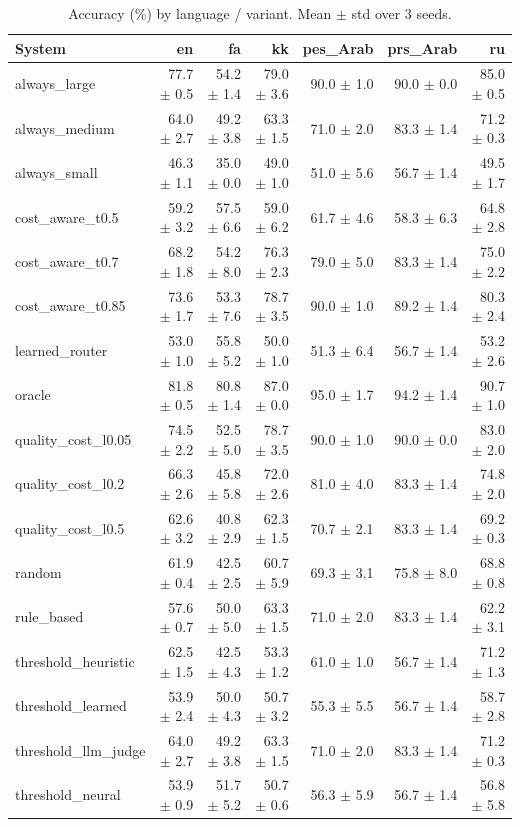 \begin{table}[t]
\centering
\small
\caption{Accuracy (\%) by language / variant. Mean $\pm$ std over 3 seeds.}
\label{tab:language_breakdown}
\begin{tabular}{lrrrrrr}
\toprule
System & en & fa & kk & pes\_Arab & prs\_Arab & ru \\
\midrule
always\_large & 77.7 $\pm$ 0.5 & 54.2 $\pm$ 1.4 & 79.0 $\pm$ 3.6 & 90.0 $\pm$ 1.0 & 90.0 $\pm$ 0.0 & 85.0 $\pm$ 0.5 \\
always\_medium & 64.0 $\pm$ 2.7 & 49.2 $\pm$ 3.8 & 63.3 $\pm$ 1.5 & 71.0 $\pm$ 2.0 & 83.3 $\pm$ 1.4 & 71.2 $\pm$ 0.3 \\
always\_small & 46.3 $\pm$ 1.1 & 35.0 $\pm$ 0.0 & 49.0 $\pm$ 1.0 & 51.0 $\pm$ 5.6 & 56.7 $\pm$ 1.4 & 49.5 $\pm$ 1.7 \\
cost\_aware\_t0.5 & 59.2 $\pm$ 3.2 & 57.5 $\pm$ 6.6 & 59.0 $\pm$ 6.2 & 61.7 $\pm$ 4.6 & 58.3 $\pm$ 6.3 & 64.8 $\pm$ 2.8 \\
cost\_aware\_t0.7 & 68.2 $\pm$ 1.8 & 54.2 $\pm$ 8.0 & 76.3 $\pm$ 2.3 & 79.0 $\pm$ 5.0 & 83.3 $\pm$ 1.4 & 75.0 $\pm$ 2.2 \\
cost\_aware\_t0.85 & 73.6 $\pm$ 1.7 & 53.3 $\pm$ 7.6 & 78.7 $\pm$ 3.5 & 90.0 $\pm$ 1.0 & 89.2 $\pm$ 1.4 & 80.3 $\pm$ 2.4 \\
learned\_router & 53.0 $\pm$ 1.0 & 55.8 $\pm$ 5.2 & 50.0 $\pm$ 1.0 & 51.3 $\pm$ 6.4 & 56.7 $\pm$ 1.4 & 53.2 $\pm$ 2.6 \\
oracle & 81.8 $\pm$ 0.5 & 80.8 $\pm$ 1.4 & 87.0 $\pm$ 0.0 & 95.0 $\pm$ 1.7 & 94.2 $\pm$ 1.4 & 90.7 $\pm$ 1.0 \\
quality\_cost\_l0.05 & 74.5 $\pm$ 2.2 & 52.5 $\pm$ 5.0 & 78.7 $\pm$ 3.5 & 90.0 $\pm$ 1.0 & 90.0 $\pm$ 0.0 & 83.0 $\pm$ 2.0 \\
quality\_cost\_l0.2 & 66.3 $\pm$ 2.6 & 45.8 $\pm$ 5.8 & 72.0 $\pm$ 2.6 & 81.0 $\pm$ 4.0 & 83.3 $\pm$ 1.4 & 74.8 $\pm$ 2.0 \\
quality\_cost\_l0.5 & 62.6 $\pm$ 3.2 & 40.8 $\pm$ 2.9 & 62.3 $\pm$ 1.5 & 70.7 $\pm$ 2.1 & 83.3 $\pm$ 1.4 & 69.2 $\pm$ 0.3 \\
random & 61.9 $\pm$ 0.4 & 42.5 $\pm$ 2.5 & 60.7 $\pm$ 5.9 & 69.3 $\pm$ 3.1 & 75.8 $\pm$ 8.0 & 68.8 $\pm$ 0.8 \\
rule\_based & 57.6 $\pm$ 0.7 & 50.0 $\pm$ 5.0 & 63.3 $\pm$ 1.5 & 71.0 $\pm$ 2.0 & 83.3 $\pm$ 1.4 & 62.2 $\pm$ 3.1 \\
threshold\_heuristic & 62.5 $\pm$ 1.5 & 42.5 $\pm$ 4.3 & 53.3 $\pm$ 1.2 & 61.0 $\pm$ 1.0 & 56.7 $\pm$ 1.4 & 71.2 $\pm$ 1.3 \\
threshold\_learned & 53.9 $\pm$ 2.4 & 50.0 $\pm$ 4.3 & 50.7 $\pm$ 3.2 & 55.3 $\pm$ 5.5 & 56.7 $\pm$ 1.4 & 58.7 $\pm$ 2.8 \\
threshold\_llm\_judge & 64.0 $\pm$ 2.7 & 49.2 $\pm$ 3.8 & 63.3 $\pm$ 1.5 & 71.0 $\pm$ 2.0 & 83.3 $\pm$ 1.4 & 71.2 $\pm$ 0.3 \\
threshold\_neural & 53.9 $\pm$ 0.9 & 51.7 $\pm$ 5.2 & 50.7 $\pm$ 0.6 & 56.3 $\pm$ 5.9 & 56.7 $\pm$ 1.4 & 56.8 $\pm$ 5.8 \\
\bottomrule
\end{tabular}
\end{table}
